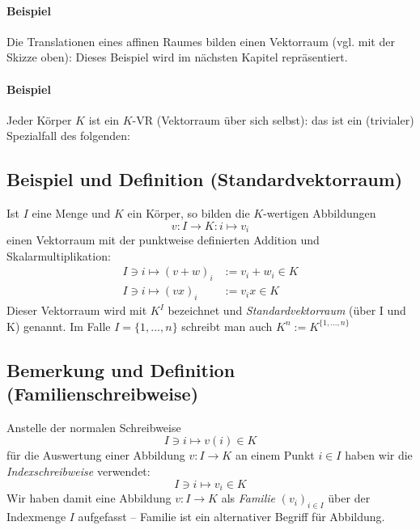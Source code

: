 \paragraph{Beispiel}
	Die Translationen eines affinen Raumes bilden einen Vektorraum (vgl. mit der Skizze oben): Dieses Beispiel wird im nächsten Kapitel repräsentiert.
	
\paragraph{Beispiel}
	Jeder Körper $ K $ ist ein $ K $-VR (Vektorraum über sich selbst): das ist ein (trivialer) Spezialfall des folgenden:
	
\subsection{Beispiel und Definition (Standardvektorraum)}
	\begin{Definition}[Standardvektorraum]
		Ist $ I $ eine Menge und $ K $ ein Körper, so bilden die $ K $-wertigen Abbildungen
		\[ v: I \to K: i \mapsto v_i \]
	einen Vektorraum mit der punktweise definierten Addition und Skalarmultiplikation:
	\begin{align*}
		I\ni i \mapsto (v+w)_i &:= v_i+w_i\in K\\
		I\ni i \mapsto (vx)_i &:= v_ix \in K
	\end{align*}
	Dieser Vektorraum wird mit $K^{I}$ bezeichnet und \emph{Standardvektorraum} (über I und K) genannt. Im Falle $ I=\{1,...,n\} $ schreibt man auch $K^{n} := K^{\{1,...,n\}}$
	\end{Definition}

\subsection{Bemerkung und Definition (Familienschreibweise)}
	\begin{Definition}
		Anstelle der normalen Schreibweise
		\[ I\ni i \mapsto v(i) \in K \]
	für die Auswertung einer Abbildung  $v: I \to K$ an einem Punkt $i\in I$ haben wir die \emph{Indexschreibweise} verwendet:	
		\[ I\ni i \mapsto v_i \in K \]
	Wir haben damit eine Abbildung $v: I \to K$ als \emph{Familie} $ (v_i)_{i\in I} $ über der Indexmenge $ I $ aufgefasst -- Familie ist ein \glqq alternativer\grqq{} Begriff für Abbildung.
	\end{Definition}
	
